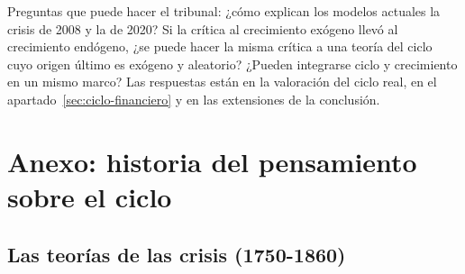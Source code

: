 \documentclass[11pt]{article}
\begin{document}
\begin{notaopositor}
Preguntas que puede hacer el tribunal: ¿cómo explican los modelos actuales la crisis de 2008 y la de 2020? Si la crítica al crecimiento exógeno llevó al crecimiento endógeno, ¿se puede hacer la misma crítica a una teoría del ciclo cuyo origen último es exógeno y aleatorio? ¿Pueden integrarse ciclo y crecimiento en un mismo marco? Las respuestas están en la valoración del ciclo real, en el apartado~\ref{sec:ciclo-financiero} y en las extensiones de la conclusión.
\end{notaopositor}

\clearpage
\appendix

\section{Anexo: historia del pensamiento sobre el ciclo}\label{anexo:historia}

\subsection{Las teorías de las crisis (1750-1860)}
\end{document}

